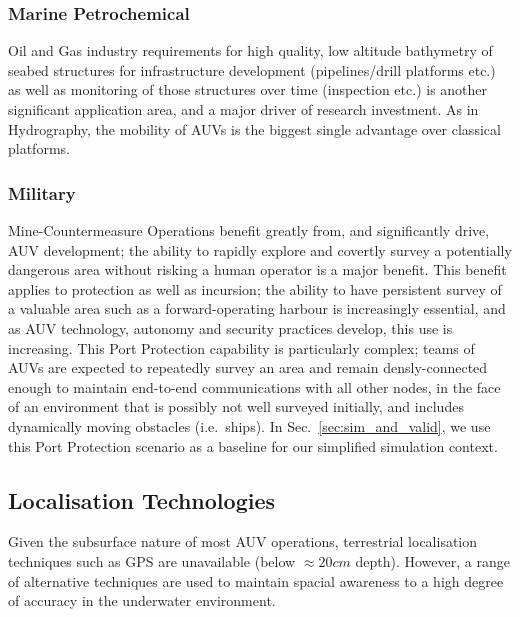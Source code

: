 \documentclass[conference]{IEEEtran}
\begin{document}
\subsubsection{Marine Petrochemical}
Oil and Gas industry requirements for high quality, low altitude bathymetry of seabed structures for infrastructure development (pipelines/drill platforms etc.) as well as monitoring of those structures over time (inspection etc.) is another significant application area, and a major driver of research investment.
As in Hydrography, the mobility of AUVs is the biggest single advantage over classical platforms\cite{Morr2003}.

\subsubsection{Military}
Mine-Countermeasure Operations benefit greatly from, and significantly drive, AUV development; the ability to rapidly explore and covertly survey a potentially dangerous area without risking a human operator is a major benefit.
This benefit applies to protection as well as incursion; the ability to have persistent survey of a valuable area such as a forward-operating harbour is increasingly essential, and as AUV technology, autonomy and security practices develop, this use is increasing.
This Port Protection capability is particularly complex;  teams of AUVs are expected to repeatedly survey an area and remain densly-connected enough to maintain end-to-end communications with all other nodes, in the face of an environment that is possibly not well surveyed initially, and includes dynamically moving obstacles (i.e.\ ships).
In Sec.~\ref{sec:sim_and_valid}, we use this Port Protection scenario as a baseline for our simplified simulation context.


\subsection{Localisation Technologies}

Given the subsurface nature of most AUV operations, terrestrial localisation techniques such as GPS are unavailable (below $\approx 20cm$ depth). 
However, a range of alternative techniques are used to maintain spacial awareness to a high degree of accuracy in the underwater environment.
\end{document}
